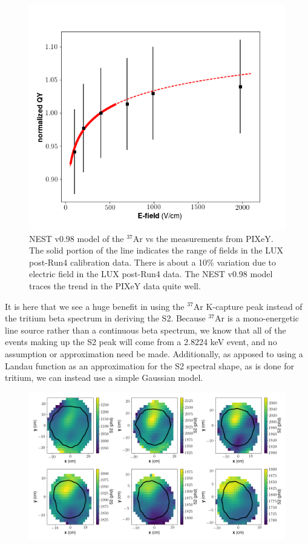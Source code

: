 \begin{figure}[h!]
\centering
\includegraphics[width=150mm]{Figures/pixey_Ar_v_ef.png}
\caption{NEST v0.98 model of the $^{37}$Ar vs the measurements from PIXeY\cite{pixey_ar37}. The solid portion of the line indicates the range of fields in the LUX post-Run4 calibration data. There is about a 10\% variation due to electric field in the LUX post-Run4 data. The NEST v0.98 model traces the trend in the PIXeY data quite well.}
\label{fig:pixey_Ar_v_ef} 
\end{figure}
It is here that we see a huge benefit in using the $^{37}$Ar K-capture peak instead of the tritium beta spectrum in deriving the S2. Because $^{37}$Ar is a mono-energetic line source rather than a continuous beta spectrum, we know that all of the events making up the S2 peak will come from a 2.8224 keV event, and no assumption or approximation need be made. Additionally, as apposed to using a Landau function as an approximation for the S2 spectral shape, as is done for tritium, we can instead use a simple Gaussian model. 
\begin{figure}[h!]
\centering
\includegraphics[width=150mm]{Figures/S2map_xy.png}
\caption{}
\label{fig:S2map_xy} 
\end{figure}

